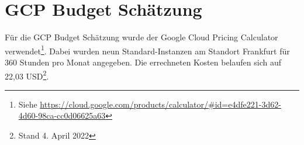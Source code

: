 \section{GCP Budget Schätzung}

Für die GCP Budget Schätzung wurde der Google Cloud Pricing Calculator verwendet\footnote{Siehe \url{https://cloud.google.com/products/calculator/\#id=e4dfe221-3d62-4d60-98ca-cc0d06625a63}}.
Dabei wurden neun Standard-Instanzen am Standort Frankfurt für 360 Stunden pro Monat angegeben.
Die errechneten Kosten belaufen sich auf 22,03 USD\footnote{Stand 4. April 2022}. 

